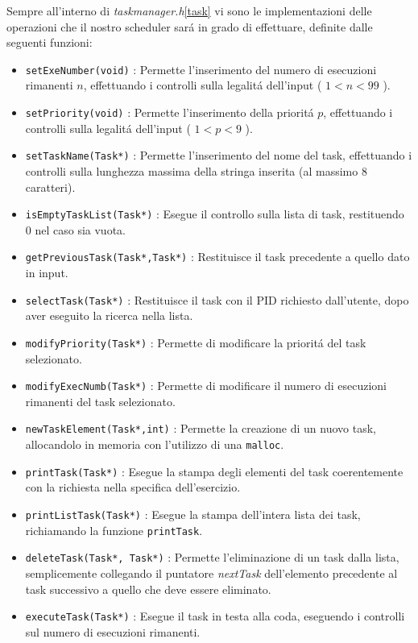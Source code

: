 \documentclass[a4paper]{article}
\begin{document}
Sempre all'interno di \textit{taskmanager.h}\ref{task} vi sono le implementazioni delle operazioni che il nostro scheduler sar\'a in grado di effettuare, definite dalle seguenti funzioni:

\begin{itemize}
\item \texttt{setExeNumber(void)} : Permette l'inserimento del numero di esecuzioni rimanenti $n$, effettuando i controlli sulla legalit\'a dell'input ( $1<n<99$ ).

\item \texttt{setPriority(void)} : Permette l'inserimento della priorit\'a $p$, effettuando i controlli sulla legalit\'a dell'input ( $ 1<p<9$ ).

\item \texttt{setTaskName(Task*)} : Permette l'inserimento del nome del task, effettuando i controlli sulla lunghezza massima della stringa inserita (al massimo 8 caratteri).

\item \texttt{isEmptyTaskList(Task*)} : Esegue il controllo sulla lista di task, restituendo 0 nel caso sia vuota.

\item \texttt{getPreviousTask(Task*,Task*)} : Restituisce il task precedente a quello dato in input.

\item \texttt{selectTask(Task*)} : Restituisce il task con il PID richiesto dall'utente, dopo aver eseguito la ricerca nella lista.

\item \texttt{modifyPriority(Task*)} : Permette di modificare la priorit\'a del task selezionato. 

\item \texttt{modifyExecNumb(Task*)} : Permette di modificare il numero di esecuzioni rimanenti del task selezionato.

\item \texttt{newTaskElement(Task*,int)} : Permette la creazione di un nuovo task, allocandolo in memoria con l'utilizzo di una \texttt{malloc}.

\item \texttt{printTask(Task*)} : Esegue la stampa degli elementi del task coerentemente con la richiesta nella specifica dell'esercizio.

\item \texttt{printListTask(Task*)} : Esegue la stampa dell'intera lista dei task, richiamando la funzione \texttt{printTask}.

\item \texttt{deleteTask(Task*, Task*)} : Permette l'eliminazione di un task dalla lista, semplicemente collegando il puntatore \textit{nextTask} dell'elemento precedente al task successivo a quello che deve essere eliminato.

\item \texttt{executeTask(Task*)} : Esegue il task in testa alla coda, eseguendo i controlli sul numero di esecuzioni rimanenti.
\end{itemize}
\end{document}

